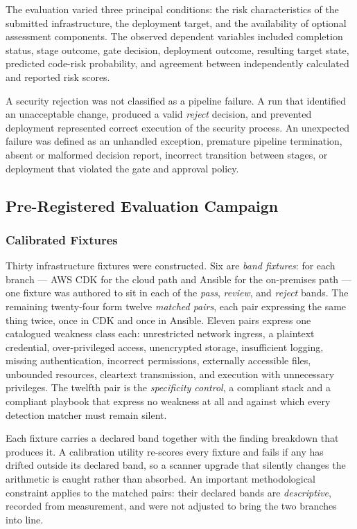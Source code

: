 The evaluation varied three principal conditions: the risk characteristics of the
submitted infrastructure, the deployment target, and the availability of optional
assessment components. The observed dependent variables included completion status,
stage outcome, gate decision, deployment outcome, resulting target state, predicted
code-risk probability, and agreement between independently calculated and reported risk
scores.

A security rejection was not classified as a pipeline failure. A run that identified an
unacceptable change, produced a valid \emph{reject} decision, and prevented deployment
represented correct execution of the security process. An unexpected failure was defined
as an unhandled exception, premature pipeline termination, absent or malformed decision
report, incorrect transition between stages, or deployment that violated the gate and
approval policy.

\subsection{Pre-Registered Evaluation Campaign}
\label{subsec:evaluation-campaign}

\subsubsection{Calibrated Fixtures}

Thirty infrastructure fixtures were constructed. Six are \emph{band fixtures}: for each branch
--- AWS CDK for the cloud path and Ansible for the on-premises path --- one
fixture was authored to sit in each of the \emph{pass}, \emph{review}, and
\emph{reject} bands. The remaining twenty-four form twelve \emph{matched pairs},
each pair expressing the same thing twice, once in CDK and once in Ansible.
Eleven pairs express one catalogued weakness class each: unrestricted network
ingress, a plaintext credential, over-privileged access, unencrypted storage,
insufficient logging, missing authentication, incorrect permissions, externally
accessible files, unbounded resources, cleartext transmission, and execution
with unnecessary privileges. The twelfth pair is the \emph{specificity control},
a compliant stack and a compliant playbook that express no weakness at all and
against which every detection matcher must remain silent.

Each fixture carries a declared band together with
the finding breakdown that produces it. A calibration utility re-scores every
fixture and fails if any has drifted outside its declared band, so a scanner
upgrade that silently changes the arithmetic is caught rather than absorbed. An
important methodological constraint applies to the matched pairs: their declared
bands are \emph{descriptive}, recorded from measurement, and were not adjusted
to bring the two branches into line.

